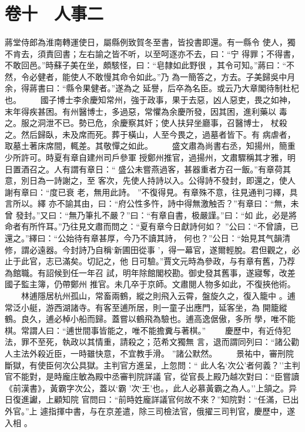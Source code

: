 \documentclass{ctexart}
\begin{document}
\section{卷十　人事二}
\paragraph{}
蔣堂侍郎為淮南轉運使日，屬縣例致賀冬至書，皆投書即還。有一縣令 使人，獨不肯去，須責回書；左右諭之皆不听，以至呵逐亦不去，曰：``宁 得罪；不得書，不敢回邑。''時蘇子美在坐，頗駭怪，曰：``皂隸如此野很 ，其令可知。''蔣曰：``不然，令必健者，能使人不敢慢其命令如此。''乃 為一簡答之，方去。子美歸吳中月余，得蔣書曰：``縣令果健者。''遂為之 延譽，后卒為名臣。或云乃大章閣待制杜杞也。 　　國子博士李余慶知常州，強于政事，果于去惡，凶人惡吏，畏之如神， 末年得疾甚困。有州醫博士，多過惡，常懼為余慶所發，因其困，進利藥以 毒之。服之洞泄不已。勢已危，余慶察其奸；使人扶舁坐廳事，召醫博士， 杖殺之。然后歸臥，未及席而死。葬于橫山，人至今畏之，過墓者皆下。有 病虐者，取墓土著床席間，輒差。其敬憚之如此。 　　盛文肅為尚書右丞，知揚州，簡重少所許可。時夏有章自建州司戶參軍 授鄭州推官，過揚州，文肅驟稱其才雅，明日置酒召之。人有謂有章日：`` 盛公未嘗燕過客，甚器重者方召一飯。''有章荷其意，別日為一詩謝之，至 客次，先使人持詩以入。公得詩不發封，即還之，使人謝有章曰：``度已衰 老，無用此詩。 ''不復得見。有章殊不意，往見通判刁繹，具言所以。繹 亦不諭其由，曰：``府公性多忤，詩中得無激触否？''有章曰：``無，未曾 發封。''又曰：``無乃筆扎不嚴？''曰：``有章自書，极嚴謹。''曰：``如 此，必是將命者有所忤耳。''乃往見文肅而問之：``夏有章今日獻詩何如？ ''公曰：``不曾讀，已還之。''繹曰：``公始待有章甚厚，今乃不讀其詩， 何也？''公日：``始見其气韻清修，謂必遠器。今封詩乃自稱`新圃田從事 '，得一幕官，遂爾輕脫。君但觀之，必止于此官，志已滿矣。切記之，他 日可驗。''賈文元時為參政，与有章有舊，乃荐為館職。有詔候到任一年召 試，明年除館閣校勘。御史發其舊事，遂寢奪，改差國子監主簿，仍帶鄭州 推官。未几卒于京師。文肅閱人物多如此，不復挾他術。 　　林逋隱居杭州孤山，常畜兩鶴，縱之則飛入云霄，盤旋久之，復入籠中 。逋常泛小艇，游西湖諸寺。有客至逋所居，則一童子出應門，延客坐，為 開籠縱鶴。良久，逋必棹小船而歸。蓋嘗以鶴飛為驗也。逋高逸倨傲，多所 學，唯不能棋。常謂人曰：``逋世間事皆能之，唯不能擔糞与著棋。'' 　　慶歷中，有近侍犯法，罪不至死，執政以其情重，請殺之；范希文獨無 言，退而謂同列曰：``諸公勸人主法外殺近臣，一時雖快意，不宜教手滑。 ''諸公默然。 　　景祐中，審刑院斷獄，有使臣何次公具獄。主判官方進呈，上忽問：`` 此人名`次公'者何義？''主判官不能對，是時龐庄敏為殿中丞審判院詳議 官，從官長上殿乃越次對曰：``臣嘗讀《前漢書》，黃霸字次公，蓋以`霸 '次`王'也。，此人必慕黃霸之為人。''上頷之。异日復進讞，上顧知院 官問曰：``前時姓龐詳議官何故不來？''知院對：``任滿，已出外官。''上 遽指揮中書，与在京差遣，除三司檢法官，俄擢三司判官，慶歷中，遂入相 。
\clearpage
\end{document}
